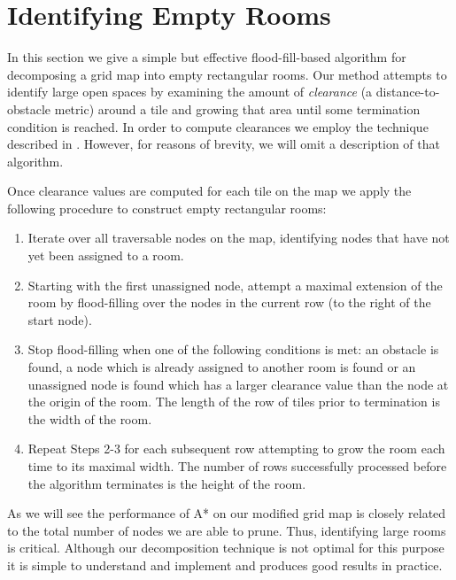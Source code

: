 \section{Identifying Empty Rooms}
\label{empty rooms}
In this section we give a simple but effective flood-fill-based algorithm for decomposing a 
grid map into empty rectangular rooms.
Our method attempts to identify large open spaces by examining the amount of \emph{clearance}
(a distance-to-obstacle metric) around a tile and growing that area until some termination 
condition is reached.
In order to compute clearances we employ the technique described in \cite{harabor08}.
However, for reasons of brevity, we will omit a description of that algorithm.
%
\par
Once clearance values are computed for each tile on the map we apply the following
procedure to construct empty rectangular rooms:


\begin{enumerate}
\item{Iterate over all traversable nodes on the map, identifying nodes that have not yet 
been assigned to a room.}
\item{Starting with the first unassigned node, attempt a maximal extension of the room
by flood-filling over the nodes in the current row (to the right of the start node).}
\item{Stop flood-filling when one of the following conditions is met: an obstacle is found,
a node which is already assigned to another room is found or an unassigned
node is found which has a larger clearance value than the node at the origin of the room.
The length of the row of tiles prior to termination is the width of the room.}
\item{Repeat Steps 2-3 for each subsequent row attempting to grow the room
each time to its maximal width.
The number of rows successfully processed before the algorithm terminates is the height of the room.}
\end{enumerate}


As we will see the performance of A* on our modified grid map is closely related to the total 
number of nodes we are able to prune.
Thus, identifying large rooms is critical.
Although our decomposition technique is not optimal for this purpose it is simple
to understand and implement and produces good results in practice.

